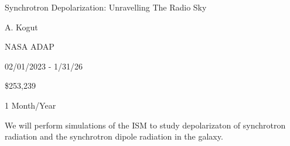 
 Synchrotron Depolarization: Unravelling The Radio Sky

 A. Kogut

 NASA ADAP

 02/01/2023 - 1/31/26

 \$253,239

 1 Month/Year

We will perform simulations of the ISM to study depolarizaton of synchrotron
radiation and the synchrotron dipole radiation in the galaxy.
